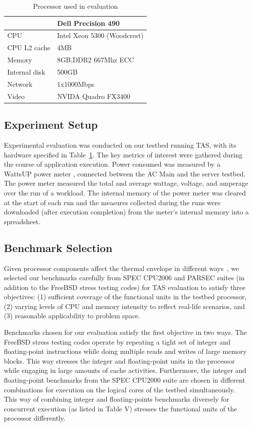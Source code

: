 \documentclass[times, 10pt,twocolumn]{IEEEtran}
\begin{document}
\begin{small}
\begin{table}[tbhp] 
\centering
  \caption{Processor used in evaluation}
  \label{tab:hardware}
  \begin{tabular}{l l} 
\hline 
\hline
&\textbf{Dell Precision 490}\\ 
\hline 
CPU&Intel Xeon 5300 (Woodcrest)\\ 
CPU L2 cache&4MB\\ 
Memory&8GB,DDR2 667Mhz ECC\\
Internal disk&500GB\\ 
Network&1x1000Mbps\\ 
Video&NVIDA Quadro FX3400\\ 
\hline
  \end{tabular}
\end{table}
\end{small}
\subsection{Experiment Setup}
\label{sec:experiment-setup} 
Experimental evaluation was conducted on our testbed running TAS, with
its hardware specified in Table~\ref{tab:hardware}.  The key metrics of
interest were gathered during the course of application execution.
Power consumed was measured by a WattsUP power meter
\cite{WattsUp2006a}, connected between the AC Main and the server
testbed.  The power meter measured the total and average wattage,
voltage, and amperage over the run of a workload.  The internal memory
of the power meter was cleared at the start of each run and the measures
collected during the runs were downloaded (after execution completion)
from the meter's internal memory into a spreadsheet.
\subsection{Benchmark Selection}
\label{sec:experimental-setup-1} 
Given processor components affect the thermal envelope in different
ways~\cite{Kumar2008}, we selected our benchmarks carefully from SPEC
CPU2006 and PARSEC suites (in addition to the FreeBSD stress testing
codes) for TAS evaluation to satisfy three objectives: (1) sufficient
coverage of the functional units in the testbed processor, (2) varying
levels of CPU and memory intensity to reflect real-life scenarios, and
(3) reasonable applicability to problem space.

Benchmarks chosen for our evaluation satisfy the first objective in two
ways.  The FreeBSD stress testing codes operate by repeating a tight set
of integer and floating-point instructions while doing multiple reads
and writes of large memory blocks.  This way stresses the integer and
floating-point units in the processor while engaging in large amounts of
cache activities.  Furthermore, the integer and floating-point
benchmarks from the SPEC CPU2000 suite are chosen in different
combinations for execution on the logical cores of the testbed
simultaneously.  This way of combining integer and floating-points
benchmarks diversely for concurrent execution (as listed in Table V)
stresses the functional units of the processor differently.
\end{document}
